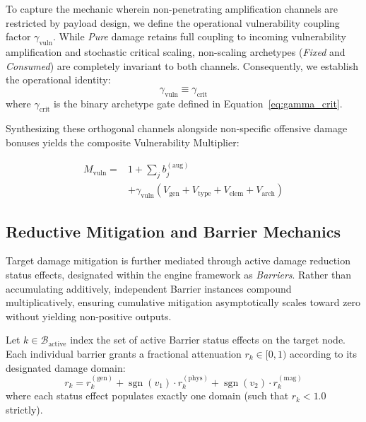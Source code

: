 \documentclass[twocolumn,10pt]{article}
\DeclareMathOperator{\sgn}{sgn}
\begin{document}
To capture the mechanic wherein non-penetrating amplification channels are restricted by payload design, we define the operational vulnerability coupling factor $\gamma_{\text{vuln}}$. While \textit{Pure} damage retains full coupling to incoming vulnerability amplification and stochastic critical scaling, non-scaling archetypes (\textit{Fixed} and \textit{Consumed}) are completely invariant to both channels. Consequently, we establish the operational identity:
\begin{equation}
\label{eq:gamma_vuln_identity}
\gamma_{\text{vuln}} \equiv \gamma_{\text{crit}}
\end{equation}
where $\gamma_{\text{crit}}$ is the binary archetype gate defined in Equation~\ref{eq:gamma_crit}.

Synthesizing these orthogonal channels alongside non-specific offensive damage bonuses yields the composite Vulnerability Multiplier:

\begin{equation}
\label{eq:vuln_multiplier}
\begin{split}
  M_{\text{vuln}} = {} & 1 + \sum_{j} b_j^{(\text{aug})} \\
  &+ \gamma_{\text{vuln}} \left(V_{\text{gen}} + V_{\text{type}} + V_{\text{elem}} + V_{\text{arch}}\right)
\end{split}
\end{equation}


\subsection{Reductive Mitigation and Barrier Mechanics}
\label{sec:barriers}
Target damage mitigation is further mediated through active damage reduction status effects, designated within the engine framework as \textit{Barriers}. Rather than accumulating additively, independent Barrier instances compound multiplicatively, ensuring cumulative mitigation asymptotically scales toward zero without yielding non-positive outputs.

Let $k \in \mathcal{B}_{\text{active}}$ index the set of active Barrier status effects on the target node. Each individual barrier grants a fractional attenuation $r_k \in [0, 1)$ according to its designated damage domain:
\begin{equation}
\label{eq:barrier_component}
r_k = r_k^{(\text{gen})} + \sgn(v_1) \cdot r_k^{(\text{phys})} + \sgn(v_2) \cdot r_k^{(\text{mag})}
\end{equation}
where each status effect populates exactly one domain (such that $r_k < 1.0$ strictly).
\end{document}
